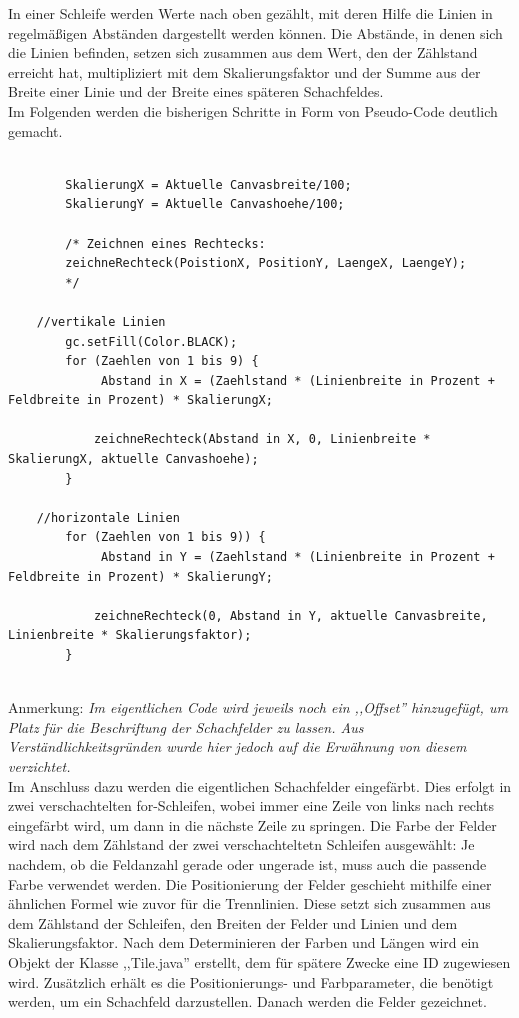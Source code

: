 \documentclass[12pt,a4paper]{article}
\begin{document}
In einer Schleife werden Werte nach oben gezählt, mit deren Hilfe die Linien in regelmäßigen Abständen dargestellt werden können. Die Abstände, in denen sich die Linien befinden, setzen sich zusammen aus dem Wert, den der Zählstand erreicht hat, multipliziert mit dem Skalierungsfaktor und der Summe aus der Breite einer Linie und der Breite eines späteren Schachfeldes.\\
Im Folgenden werden die bisherigen Schritte in Form von Pseudo-Code deutlich gemacht.\\
\lstset{language=java}
\begin{lstlisting}

		SkalierungX = Aktuelle Canvasbreite/100;
		SkalierungY = Aktuelle Canvashoehe/100;
		
		/* Zeichnen eines Rechtecks: 
		zeichneRechteck(PoistionX, PositionY, LaengeX, LaengeY);
		*/
	
	//vertikale Linien
		gc.setFill(Color.BLACK);
		for (Zaehlen von 1 bis 9) {
			 Abstand in X = (Zaehlstand * (Linienbreite in Prozent + Feldbreite in Prozent) * SkalierungX;
			 
			zeichneRechteck(Abstand in X, 0, Linienbreite * SkalierungX, aktuelle Canvashoehe);
		}

	//horizontale Linien		
		for (Zaehlen von 1 bis 9)) {
			 Abstand in Y = (Zaehlstand * (Linienbreite in Prozent + Feldbreite in Prozent) * SkalierungY;
			 
			zeichneRechteck(0, Abstand in Y, aktuelle Canvasbreite, Linienbreite * Skalierungsfaktor);
		}
		
\end{lstlisting}
Anmerkung: \textit{Im eigentlichen Code wird jeweils noch ein ,,Offset'' hinzugefügt, um Platz für die Beschriftung der Schachfelder zu lassen. Aus Verständlichkeitsgründen wurde hier jedoch auf die Erwähnung von diesem verzichtet.} \\[2ex]
Im Anschluss dazu werden die eigentlichen Schachfelder eingefärbt. Dies erfolgt in zwei verschachtelten for-Schleifen, wobei immer eine Zeile von links nach rechts eingefärbt wird, um dann in die nächste Zeile zu springen. Die Farbe der Felder wird nach dem Zählstand der zwei verschachteltetn Schleifen ausgewählt: Je nachdem, ob die Feldanzahl gerade oder ungerade ist, muss auch die passende Farbe verwendet werden. Die Positionierung der Felder geschieht mithilfe einer ähnlichen Formel wie zuvor für die Trennlinien. Diese setzt sich zusammen aus dem Zählstand der Schleifen, den Breiten der Felder und Linien und dem Skalierungsfaktor. Nach dem Determinieren der Farben und Längen wird ein Objekt der Klasse ,,Tile.java'' erstellt, dem für spätere Zwecke eine ID zugewiesen wird. Zusätzlich erhält es die Positionierungs- und Farbparameter, die benötigt werden, um ein Schachfeld darzustellen. Danach werden die Felder gezeichnet. 
\end{document}
